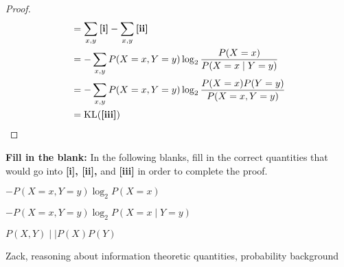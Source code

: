 \begin{parts}
\begin{subparts}
\begin{proof}
\begin{align}
        &=  \sum_{x, y}\text{\textbf{[i]}} - \sum_{x, y}\text{\textbf{[ii]}} \\
        &= - \sum_{x, y} P(X=x, Y=y) \log_2\frac{P(X=x)}{P(X=x \mid Y=y)}\\
        &= -\sum_{x, y} P(X=x, Y=y) \log_2\frac{P(X=x)P(Y=y)}{P(X=x, Y=y)}\\
        &= \text{KL}(\text{\textbf{[iii]}})
    \end{align}
    \end{proof}
\textbf{Fill in the blank:} In the following blanks, fill in the correct quantities that would go into \textbf{[i], [ii],} and \textbf{[iii]} in order to complete the proof.
\begin{subsubparts}
    \subsubpart \begin{tcolorbox}[fit,height=1.5cm, width=9cm, blank, borderline={1pt}{-2pt}]
    \begin{soln}
        $- P(X=x, Y = y) \log_2 P(X=x)$
    \end{soln}
\end{tcolorbox}
    \subsubpart \begin{tcolorbox}[fit,height=1.5cm, width=9cm, blank, borderline={1pt}{-2pt}]
    \begin{soln}
        $- P(X=x, Y = y) \log_2 P(X=x \mid Y=y)$
    \end{soln}
\end{tcolorbox}
    \subsubpart \begin{tcolorbox}[fit,height=1.5cm, width=9cm, blank, borderline={1pt}{-2pt}]
    \begin{soln}
        $P(X, Y) \mid\mid P(X)P(Y)$
    \end{soln}
\end{tcolorbox}
\end{subsubparts}
    \begin{qauthor}
        Zack, reasoning about information theoretic quantities, probability background
    \end{qauthor}
    

\end{subparts}
\end{parts}
